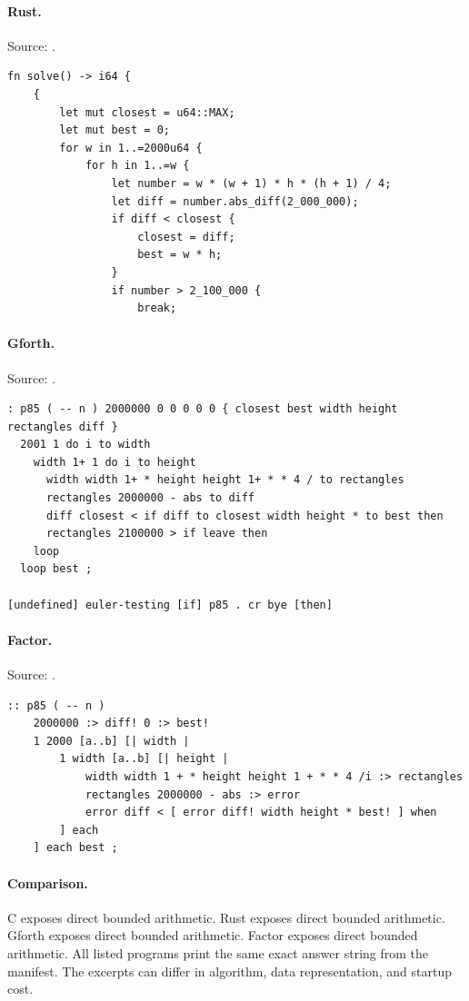 \paragraph{Rust.} Source: .
\begin{lstlisting}
fn solve() -> i64 {
    {
        let mut closest = u64::MAX;
        let mut best = 0;
        for w in 1..=2000u64 {
            for h in 1..=w {
                let number = w * (w + 1) * h * (h + 1) / 4;
                let diff = number.abs_diff(2_000_000);
                if diff < closest {
                    closest = diff;
                    best = w * h;
                }
                if number > 2_100_000 {
                    break;
\end{lstlisting}

\paragraph{Gforth.} Source: .
\begin{lstlisting}
: p85 ( -- n ) 2000000 0 0 0 0 0 { closest best width height rectangles diff }
  2001 1 do i to width
    width 1+ 1 do i to height
      width width 1+ * height height 1+ * * 4 / to rectangles
      rectangles 2000000 - abs to diff
      diff closest < if diff to closest width height * to best then
      rectangles 2100000 > if leave then
    loop
  loop best ;

[undefined] euler-testing [if] p85 . cr bye [then]
\end{lstlisting}

\paragraph{Factor.} Source: .
\begin{lstlisting}
:: p85 ( -- n )
    2000000 :> diff! 0 :> best!
    1 2000 [a..b] [| width |
        1 width [a..b] [| height |
            width width 1 + * height height 1 + * * 4 /i :> rectangles
            rectangles 2000000 - abs :> error
            error diff < [ error diff! width height * best! ] when
        ] each
    ] each best ;
\end{lstlisting}

\paragraph{Comparison.}
C exposes direct bounded arithmetic. Rust exposes direct bounded arithmetic. Gforth exposes direct bounded arithmetic. Factor exposes direct bounded arithmetic.
All listed programs print the same exact answer string from the manifest. The excerpts can differ in algorithm, data representation, and startup cost.

